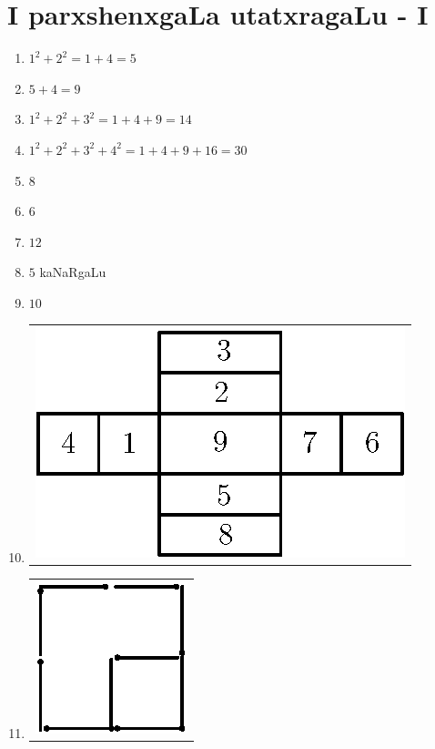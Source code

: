\chapter{I parxshenxgaLa utatxragaLu - {\rm I}}

\begin{enumerate}
 \renewcommand{\labelenumi}{\rm(\theenumi)}
\item $1^2+ 2^2 = 1+4=5$

\item $5+4=9$

\item $1^2+2^2+3^2 = 1+4+9 =14$

\item $1^2 + 2^2 + 3^2+4^2 = 1+4+9+16 = 30$

\item $8$

\item $6$

\item $12$

\item $5$ kaNaRgaLu

\item $10$

\item
\begin{tabular}[c]{l}
 \includegraphics{src/figures/ans10.eps}
\end{tabular}


\item 
\begin{tabular}[c]{c}
\centering
\includegraphics{src/figures/ans11.eps}
\end{tabular}


\end{enumerate}
